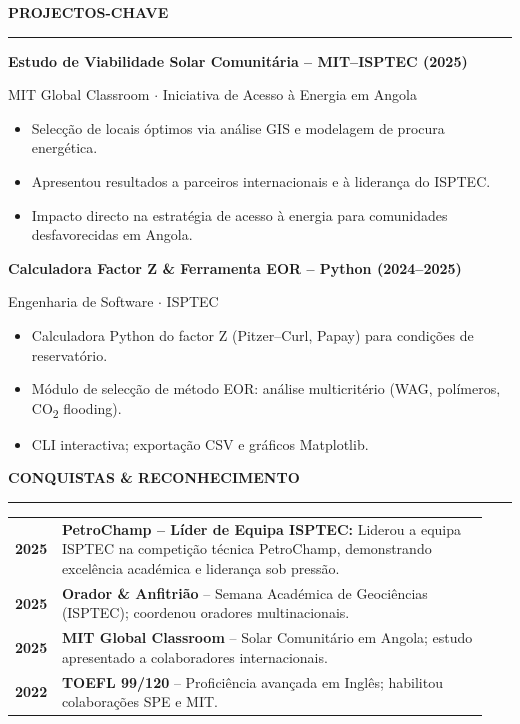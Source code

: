 \documentclass[10pt,a4paper]{article}
\newcommand{\mainSection}[1]{%
  \vspace{1pt}%
  {\bfseries\color{navy}\large\MakeUppercase{#1}}%
  \par\vspace{0pt}%
  {\color{navy}\rule{\linewidth}{1.0pt}}%
  \par\vspace{1pt}%
}
\begin{document}
\begin{minipage}[t]{\dimexpr 0.705\paperwidth - 26pt}
  \mainSection{Projectos-Chave}

  {\small\bfseries\color{navy}Estudo de Viabilidade Solar Comunitária -- MIT--ISPTEC (2025)}\par
  {\footnotesize\color{mutedtext}MIT Global Classroom $\cdot$ Iniciativa de Acesso à Energia em Angola}
  \begin{itemize}
    \item Selecção de locais óptimos via análise GIS e modelagem de procura energética.
    \item Apresentou resultados a parceiros internacionais e à liderança do ISPTEC.
    \item Impacto directo na estratégia de acesso à energia para comunidades desfavorecidas em Angola.
  \end{itemize}

  \vspace{2pt}
  {\small\bfseries\color{navy}Calculadora Factor Z \& Ferramenta EOR -- Python (2024--2025)}\par
  {\footnotesize\color{mutedtext}Engenharia de Software $\cdot$ ISPTEC}
  \begin{itemize}
    \item Calculadora Python do factor Z (Pitzer--Curl, Papay) para condições de reservatório.
    \item Módulo de selecção de método EOR: análise multicritério (WAG, polímeros,
          CO\textsubscript{2} flooding).
    \item CLI interactiva; exportação CSV e gráficos Matplotlib.
  \end{itemize}

  \mainSection{Conquistas \& Reconhecimento}

  \renewcommand{\arraystretch}{1.40}
  \begin{tabular}{@{} p{0.06\linewidth} p{0.88\linewidth} @{}}
    {\footnotesize\bfseries\color{navy}2025} &
      \textbf{PetroChamp -- Líder de Equipa ISPTEC:} Liderou a equipa ISPTEC
      na competição técnica PetroChamp, demonstrando excelência académica e
      liderança sob pressão.\\
    {\footnotesize\bfseries\color{navy}2025} &
      \textbf{Orador \& Anfitrião} -- Semana Académica de Geociências (ISPTEC);
      coordenou oradores multinacionais.\\
    {\footnotesize\bfseries\color{navy}2025} &
      \textbf{MIT Global Classroom} -- Solar Comunitário em Angola; estudo
      apresentado a colaboradores internacionais.\\
    {\footnotesize\bfseries\color{navy}2022} &
      \textbf{TOEFL 99/120} -- Proficiência avançada em Inglês; habilitou
      colaborações SPE e MIT.\\
  \end{tabular}
  \renewcommand{\arraystretch}{1}


\end{minipage}
\end{document}
